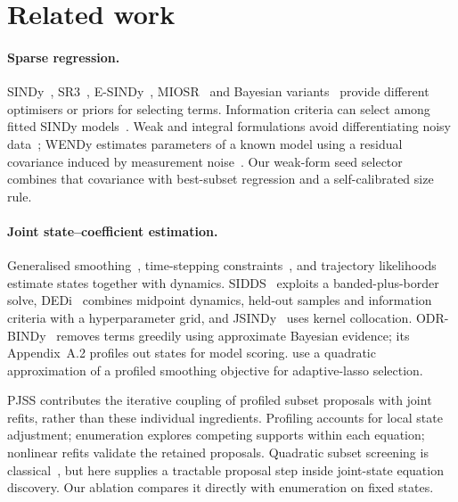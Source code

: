 \section{Related work}
\label{sec:related}

\paragraph{Sparse regression.} SINDy~\citep{brunton2016sindy}, SR3~\citep{zheng2019sr3,champion2020sr3}, E-SINDy~\citep{fasel2022esindy}, MIOSR~\citep{bertsimas2023miosr} and Bayesian variants~\citep{hirsh2022sparsifying} provide different optimisers or priors for selecting terms. Information criteria can select among fitted SINDy models~\citep{mangan2017model}. Weak and integral formulations avoid differentiating noisy data~\citep{schaeffer2017integral,messenger2021wsindy}; WENDy estimates parameters of a known model using a residual covariance induced by measurement noise~\citep{bortz2023wendy}. Our weak-form seed selector combines that covariance with best-subset regression and a self-calibrated size rule.

\paragraph{Joint state--coefficient estimation.} Generalised smoothing~\citep{ramsay2007parameter}, time-stepping constraints~\citep{rudy2019deep,kaheman2022autodiff}, and trajectory likelihoods~\citep{galioto2023bayesian} estimate states together with dynamics. SIDDS~\citep{sidds2022} exploits a banded-plus-border solve, DEDi~\citep{meissner2024dedi} combines midpoint dynamics, held-out samples and information criteria with a hyperparameter grid, and JSINDy~\citep{jsindy2025} uses kernel collocation. ODR-BINDy~\citep{fung2025odrbindy} removes terms greedily using approximate Bayesian evidence; its Appendix~A.2 profiles out states for model scoring. \citet{zhang2015selection} use a quadratic approximation of a profiled smoothing objective for adaptive-lasso selection.

PJSS contributes the iterative coupling of profiled subset proposals with joint refits, rather than these individual ingredients. Profiling accounts for local state adjustment; enumeration explores competing supports within each equation; nonlinear refits validate the retained proposals. Quadratic subset screening is classical~\citep{lawless1978screening}, but here supplies a tractable proposal step inside joint-state equation discovery. Our ablation compares it directly with enumeration on fixed states.

